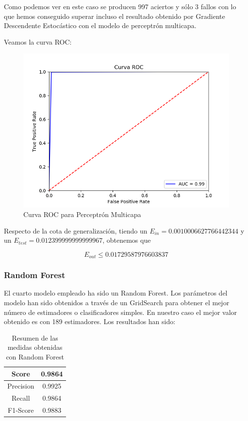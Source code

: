 Como podemos ver en este caso se producen 997 aciertos y sólo 3 fallos con lo que hemos conseguido superar incluso el resultado obtenido por Gradiente Descendente Estocástico con el modelo de perceptrón multicapa.

Veamos la curva ROC:

\begin{figure}[H] %
	\centering
	\includegraphics[scale=0.6]{ROC-NEURONAL.png}  %
	\caption{Curva ROC para Perceptrón Multicapa} 
	\label{fig:roc-pmc}
\end{figure}

Respecto de la cota de generalización, tiendo un $E_{in}=0.0010006627766442344 $ y un $E_{test} =0.012399999999999967 $, obtenemos que

$$E_{out} \leq 0.01729587976603837$$


\subsubsection{Random Forest}

El cuarto modelo empleado ha sido un Random Forest. Los parámetros del modelo han sido obtenidos a través de un GridSearch para obtener el mejor número de estimadores o clasificadores simples. En nuestro caso el mejor valor obtenido es con 189 estimadores. Los resultados han sido:

\begin{table}[H]
	\centering
	\begin{tabular}{|c|c|}
		\hline
		Score     & 0.9864   \\ \hline
		Precision & 0.9925  \\ \hline
		Recall    & 0.9864   \\ \hline
		F1-Score  & 0.9883 \\ \hline
	\end{tabular}
	\caption{Resumen de las medidas obtenidas con Random Forest}
\end{table}

